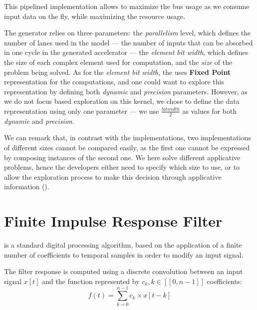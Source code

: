         This pipelined implementation allows to maximize the  bus usage as we consume input data on the fly, while maximizing the resource usage.

        The  generator relies on three parameters: the {\it parallelism} level, which defines the number of lanes used in the  model --- \ie the number of inputs that can be absorbed in one cycle in the generated accelerator --- the {\it element bit width}, which defines the size of each complex element used for computation, and the {\it size} of the  problem being solved.
        As for the {\it element bit width}, the  uses {\bf Fixed Point} representation for the computations, and one could want to explore this representation by defining both {\it dynamic} and {\it precision} parameters. 
        However, as we do not focus  based exploration on this kernel, we chose to define the data representation using only one parameter --- we use $\frac{bit width}{2}$ as values for both {\it dynamic} and {\it precision}.

        We can remark that, in contrast with the  implementations, two  implementations of different sizes cannot be compared easily, as the first one cannot be expressed by composing instances of the second one.
        We here solve different applicative problems, hence the developers either need to specify which size to use, or to allow the exploration process to make this decision through applicative information (\eg {}).

    \section*{Finite Impulse Response Filter}
         is a standard digital processing algorithm, based on the application of a finite number of coefficients to temporal samples in order to modify an input signal.

        The filter response is computed using a discrete convolution between an input signal $x[t]$ and the function represented by $c_k, k\in [\![0, n-1]\!]$ coefficients:
        \begin{equation}
            \label{app.benchmark:sec.fir:eq.formula}
            f(t) = \sum_{k = 0}^{n-1} c_k \times x[t - k]
        \end{equation}


